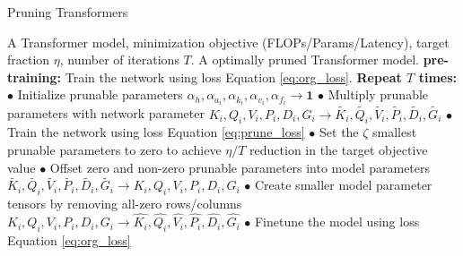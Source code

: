 \documentclass[11pt,a4paper]{article}
\begin{document}
\begin{center}
\begin{algorithm}
\caption{Pruning Transformers}
\begin{algorithmic} \label{algo:algo1}
    \REQUIRE A Transformer model, minimization objective (FLOPs/Params/Latency), target fraction $\eta$, number of iterations $T$.
	\ENSURE A optimally pruned Transformer model.
    	\STATE \hspace{-1em} {\textbf{pre-training: }Train the network using loss Equation \eqref{eq:org_loss}.}
	\STATE \hspace{-1em}\textbf{Repeat $T$ times:} 
	\STATE $\bullet$ Initialize prunable parameters $\alpha_h, \alpha_{a_i}, \alpha_{k_i}, \alpha_{v_i}, \alpha_{f_i} \rightarrow \mathbf{1}$
	\STATE $\bullet$  Multiply prunable parameters with network parameter
	\STATE $K_i, Q_i, V_i, P_i, D_i, G_i \rightarrow \widetilde{K_i}, \widetilde{Q_i},
	\widetilde{V_i}, \widetilde{P_i}, \widetilde{D_i}, \widetilde{G_i}$
	\STATE $\bullet$ Train the network using loss Equation \eqref{eq:prune_loss}
	\STATE $\bullet$  Set the $\zeta$ smallest prunable parameters to zero to achieve $\eta/T$ reduction in the target objective value
	\STATE $\bullet$ Offset zero and non-zero prunable parameters into model parameters
	\STATE $\widetilde{K_i}, \widetilde{Q_i},
	\widetilde{V_i}, \widetilde{P_i}, \widetilde{D_i}, \widetilde{G_i} \rightarrow   K_i, Q_i, V_i, P_i, D_i, G_i$	
	\STATE $\bullet$ Create smaller model parameter tensors by removing all-zero rows/columns
	\STATE $K_i, Q_i, V_i, P_i, D_i, G_i \rightarrow \widehat{K_i}, \widehat{Q_i},
	\widehat{V_i}, \widehat{P_i}, \widehat{D_i}, \widehat{G_i}$
	\STATE $\bullet$ Finetune the model using loss Equation \eqref{eq:org_loss}
\end{algorithmic}
\end{algorithm}
\end{center}
\end{document}
